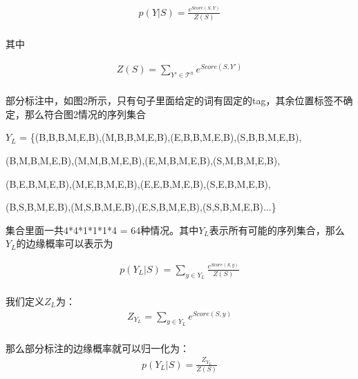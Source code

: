 \documentclass[a4paper, 11pt]{article}
\begin{document}
\begin{equation} \label{eq:CRF_probability}
\begin{split}
p(Y|S) = \frac{e^{\textit{Score}(S, Y)}}{Z(S)} \\
\end{split}
\end{equation}

其中

\begin{equation} \label{eq:zx}
\begin{split}
Z(S) = \sum_{Y' \in \mathcal{T}^n}e^{\textit{Score}(S, Y')} \\
\end{split}
\end{equation}

部分标注中，如图2所示，只有句子里面给定的词有固定的tag，其余位置标签不确定，那么符合图2情况的序列集合

$Y_L$ = \{(B,B,B,M,E,B),(M,B,B,M,E,B),(E,B,B,M,E,B),(S,B,B,M,E,B),

\indent\hspace{0.9cm}	(B,M,B,M,E,B),(M,M,B,M,E,B),(E,M,B,M,E,B),(S,M,B,M,E,B),

\indent\hspace{0.9cm}	(B,E,B,M,E,B),(M,E,B,M,E,B),(E,E,B,M,E,B),(S,E,B,M,E,B),

\indent\hspace{0.9cm}	(B,S,B,M,E,B),(M,S,B,M,E,B),(E,S,B,M,E,B),(S,S,B,M,E,B)...\}

\noindent 集合里面一共4*4*1*1*1*4 = 64种情况。其中$Y_L$表示所有可能的序列集合，那么$Y_L$的边缘概率可以表示为


\begin{equation} \label{eq:CRF_partial_probability}
\begin{split}
p(Y_L|S) = \sum_{y \in {Y_L} }\frac{e^{\textit{Score}(S, y)}}{Z(S)} \\
\end{split}
\end{equation}

我们定义${Z_L}$为：
\begin{equation} \label{eq:CRF_partial_Z_probability}
\begin{split}
Z_{Y_L} = \sum_{y \in {Y_L} }{e^{{Score}(S, y)}} \\
\end{split}
\end{equation}

那么部分标注的边缘概率就可以归一化为：
\begin{equation} \label{eq:CRF_normal_partial__probability}
\begin{split}
p(Y_L|S) =  \frac{Z_{Y_L}}{Z(S)} \\
\end{split}
\end{equation}
\end{document}
